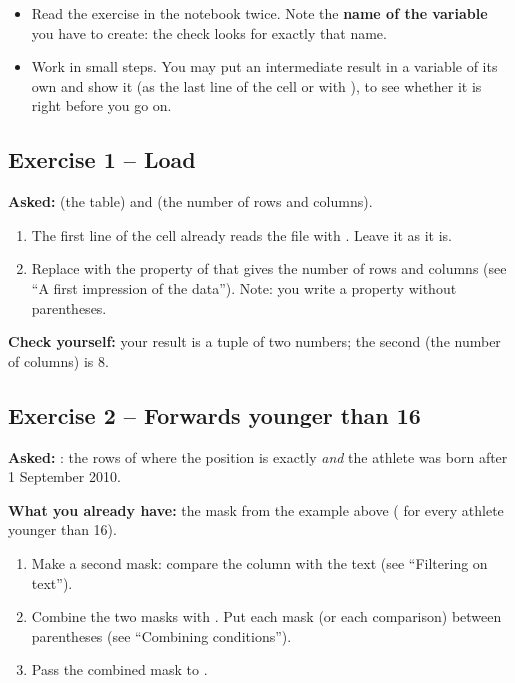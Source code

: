 \documentclass[11pt,a4paper]{article}
\begin{document}
\begin{itemize}
  \item Read the exercise in the notebook twice. Note the \textbf{name of
        the variable} you have to create: the check looks for exactly that
        name.
  \item Work in small steps. You may put an intermediate result in a
        variable of its own and show it (as the last line of the cell or
        with ), to see whether it is right before you go on.
\end{itemize}

\subsection*{Exercise 1 -- Load }

\textbf{Asked:}  (the table) and 
(the number of rows and columns).

\begin{enumerate}
  \item The first line of the cell already reads the file with
        . Leave it as it is.
  \item Replace  with the property of  that
        gives the number of rows and columns (see ``A first impression of
        the data''). Note: you write a property without parentheses.
\end{enumerate}

\textbf{Check yourself:} your result is a tuple of two numbers; the second
(the number of columns) is 8.

\subsection*{Exercise 2 -- Forwards younger than 16}

\textbf{Asked:} : the rows of 
where the position is exactly  \emph{and} the athlete was
born after 1 September 2010.

\textbf{What you already have:} the mask  from the
example above ( for every athlete younger than 16).

\begin{enumerate}
  \item Make a second mask: compare the  column with the
        text  (see ``Filtering on text'').
  \item Combine the two masks with \code{\&}. Put each mask (or each
        comparison) between parentheses (see ``Combining conditions'').
  \item Pass the combined mask to .
\end{enumerate}
\end{document}
